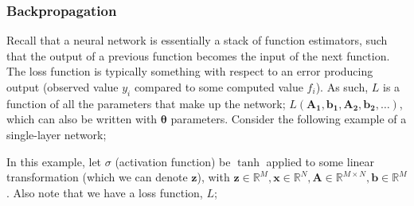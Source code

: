 \documentclass[a4paper, 12pt]{article}
\newcommand{\mat}[1]{\boldsymbol{#1}}
\renewcommand{\vec}[1]{\boldsymbol{#1}}
\newcommand{\mbbr}[0]{\mathbb{R}}
\begin{document}
            \subsubsection*{Backpropagation}
                Recall that a neural network is essentially a stack of function estimators, such that the output of a previous function becomes the input of the next function.
                The loss function is typically something with respect to an error producing output (observed value $y_i$ compared to some computed value $f_i$).
                As such, $L$ is a function of all the parameters that make up the network; $L(\mat{A_1}, \vec{b_1}, \mat{A_2}, \vec{b_2}, \dots)$, which can also be written with $\vec{\theta}$ parameters.
                Consider the following example of a single-layer network;
                \begin{center}
                \end{center}
                In this example, let $\sigma$ (activation function) be $\tanh$ applied to some linear transformation (which we can denote $\vec{z}$), with $\vec{z} \in \mbbr^M, \vec{x} \in \mbbr^N, \mat{A} \in \mbbr^{M \times N}, \vec{b} \in \mbbr^M$.
                Also note that we have a loss function, $L$;
\end{document}
